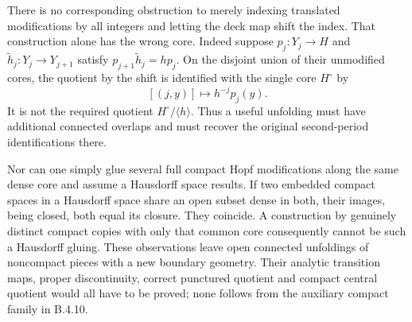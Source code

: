 \begin{remark}
There is no corresponding obstruction to merely indexing translated
modifications by all integers and letting the deck map shift the
index. That construction alone has the wrong core. Indeed suppose
$p_j:Y_j\to H$ and
$\widetilde h_j:Y_j\to Y_{j+1}$ satisfy
$p_{j+1}\widetilde h_j=hp_j$.
On the disjoint union of their unmodified cores, the quotient by
the shift is identified with the single core $H^\circ$ by
\[
 [(j,y)]\longmapsto h^{-j}p_j(y).
\]
It is not the required quotient $H^\circ/\langle h\rangle$.
Thus a useful unfolding must have additional connected overlaps
and must recover the original second-period identifications there.

Nor can one simply glue several full compact Hopf modifications
along the same dense core and assume a Hausdorff space results.
If two embedded compact spaces in a Hausdorff space share an open
subset dense in both, their images, being closed, both equal its
closure. They coincide. A construction by genuinely distinct
compact copies with only that common core consequently cannot be
such a Hausdorff gluing.
These observations leave open connected unfoldings of noncompact
pieces with a new boundary geometry. Their analytic transition
maps, proper discontinuity, correct punctured quotient and compact
central quotient would all have to be proved; none follows from
the auxiliary compact family in B.4.10.
\end{remark}
